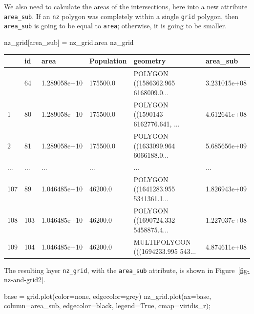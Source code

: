\documentclass[
  letterpaper,
]{krantz}
\newenvironment{Shaded}{\begin{snugshade}}{\end{snugshade}}
\newcommand{\NormalTok}[1]{\textcolor[rgb]{0.00,0.23,0.31}{#1}}
\newcommand{\OperatorTok}[1]{\textcolor[rgb]{0.37,0.37,0.37}{#1}}
\newcommand{\StringTok}[1]{\textcolor[rgb]{0.13,0.47,0.30}{#1}}
\newcommand{\VariableTok}[1]{\textcolor[rgb]{0.07,0.07,0.07}{#1}}
\begin{document}
We also need to calculate the areas of the intersections, here into a
new attribute \texttt{\textquotesingle{}area\_sub\textquotesingle{}}. If
an \texttt{nz} polygon was completely within a single \texttt{grid}
polygon, then \texttt{area\_sub} is going to be equal to \texttt{area};
otherwise, it is going to be smaller.

\begin{Shaded}
\begin{Highlighting}[]
\NormalTok{nz\_grid[}\StringTok{\textquotesingle{}area\_sub\textquotesingle{}}\NormalTok{] }\OperatorTok{=}\NormalTok{ nz\_grid.area}
\NormalTok{nz\_grid}
\end{Highlighting}
\end{Shaded}

\begin{longtable}[]{@{}llllll@{}}
\toprule\noalign{}
& id & area & Population & geometry & area\_sub \\
\midrule\noalign{}
\endhead
\bottomrule\noalign{}
\endlastfoot
0 & 64 & 1.289058e+10 & 175500.0 & POLYGON ((1586362.965 6168009.0... &
3.231015e+08 \\
1 & 80 & 1.289058e+10 & 175500.0 & POLYGON ((1590143 6162776.641, ... &
4.612641e+08 \\
2 & 81 & 1.289058e+10 & 175500.0 & POLYGON ((1633099.964 6066188.0... &
5.685656e+09 \\
... & ... & ... & ... & ... & ... \\
107 & 89 & 1.046485e+10 & 46200.0 & POLYGON ((1641283.955 5341361.1... &
1.826943e+09 \\
108 & 103 & 1.046485e+10 & 46200.0 & POLYGON ((1690724.332 5458875.4...
& 1.227037e+08 \\
109 & 104 & 1.046485e+10 & 46200.0 & MULTIPOLYGON (((1694233.995 543...
& 4.874611e+08 \\
\end{longtable}

The resulting layer \texttt{nz\_grid}, with the \texttt{area\_sub}
attribute, is shown in Figure~\ref{fig-nz-and-grid2}.

\begin{Shaded}
\begin{Highlighting}[]
\NormalTok{base }\OperatorTok{=}\NormalTok{ grid.plot(color}\OperatorTok{=}\StringTok{\textquotesingle{}none\textquotesingle{}}\NormalTok{, edgecolor}\OperatorTok{=}\StringTok{\textquotesingle{}grey\textquotesingle{}}\NormalTok{)}
\NormalTok{nz\_grid.plot(ax}\OperatorTok{=}\NormalTok{base, column}\OperatorTok{=}\StringTok{\textquotesingle{}area\_sub\textquotesingle{}}\NormalTok{, edgecolor}\OperatorTok{=}\StringTok{\textquotesingle{}black\textquotesingle{}}\NormalTok{,}
\NormalTok{             legend}\OperatorTok{=}\VariableTok{True}\NormalTok{, cmap}\OperatorTok{=}\StringTok{\textquotesingle{}viridis\_r\textquotesingle{}}\NormalTok{)}\OperatorTok{;}
\end{Highlighting}
\end{Shaded}
\end{document}
